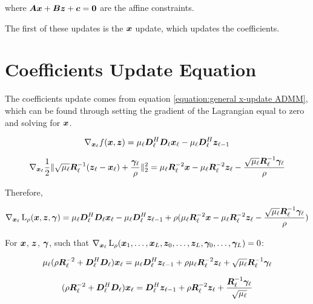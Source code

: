 where $\bm{A}\bm{x} + \bm{B}\bm{z} + \bm{c} = \bm{0}$ are the affine constraints.

The first of these updates is the $\bm{x}$ update, which updates the coefficients.


\section{Coefficients Update Equation}
The coefficients update comes from equation \ref{equation:general x-update ADMM}, which can be found through setting the gradient of the Lagrangian equal to zero and solving for $\bm{x}$.

\begin{equation}
\nabla_{\bm{x}_{\ell}} f(\bm{x},\bm{z}) = \mu_{\ell}\bm{D}_{\ell}^H\bm{D}_{\ell}\bm{x}_{\ell} - \mu_{\ell}\bm{D}_{\ell}^H\bm{z}_{\ell - 1}
\end{equation}

\begin{equation}
\nabla_{\bm{x}_{\ell}} \frac{1}{2}\|\sqrt{\mu_{\ell}}\bm{R}_{\ell}^{-1}(\bm{z}_{\ell} - \bm{x}_{\ell}) + \frac{\bm{\gamma}_{\ell}}{\rho}\|_2^2 = \mu_{\ell}\bm{R}_{\ell}^{-2}\bm{x} - \mu_{\ell}\bm{R}_{\ell}^{-2}\bm{z}_{\ell} - \frac{\sqrt{\mu_{\ell}}\bm{R}_{\ell}^{-1}\bm{\gamma}_{\ell}}{\rho}
\end{equation}

Therefore,

\begin{equation}
\nabla_{\bm{x}_{\ell}} \operatorname{L}_{\rho}(\bm{x},\bm{z},\bm{\gamma}) = \mu_{\ell}\bm{D}_{\ell}^H\bm{D}_{\ell}\bm{x}_{\ell} - \mu_{\ell}\bm{D}_{\ell}^H\bm{z}_{\ell - 1} + \rho(\mu_{\ell}\bm{R}_{\ell}^{-2}\bm{x} - \mu_{\ell}\bm{R}_{\ell}^{-2}\bm{z}_{\ell} - \frac{\sqrt{\mu_{\ell}}\bm{R}_{\ell}^{-1}\bm{\gamma}_{\ell}}{\rho})
\end{equation}

For $\bm{x}$, $\bm{z}$, $\bm{\gamma}$, such that $\nabla_{\bm{x}_{\ell}} \operatorname{L}_{\rho}(\bm{x}_1,\hdots,\bm{x}_L,\bm{z}_0,\hdots,\bm{z}_L,\bm{\gamma}_0,\hdots,\bm{\gamma}_L) = 0$:

\begin{equation}
\mu_{\ell}(\rho \bm{R}_{\ell}^{-2} + \bm{D}_{\ell}^H\bm{D}_{\ell})\bm{x}_{\ell} = \mu_{\ell}\bm{D}_{\ell}^H\bm{z}_{\ell - 1} + \rho \mu_{\ell}\bm{R}_{\ell}^{-2}\bm{z}_{\ell} + \sqrt{\mu_{\ell}}\bm{R}_{\ell}^{-1}\bm{\gamma}_{\ell}
\end{equation}

\begin{equation}
(\rho \bm{R}_{\ell}^{-2} + \bm{D}_{\ell}^H\bm{D}_{\ell})\bm{x}_{\ell} = \bm{D}_{\ell}^H\bm{z}_{\ell - 1} + \rho \bm{R}_{\ell}^{-2}\bm{z}_{\ell} + \frac{\bm{R}_{\ell}^{-1}\bm{\gamma}_{\ell}}{\sqrt{\mu_{\ell}}}
\end{equation}


